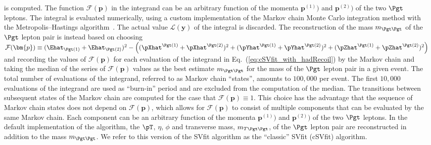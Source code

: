 is computed.
The function $\mathcal{F}(\bm{p})$ in the integrand can be an arbitrary function of the momenta $\bm{p}^{(1)})$ and $\bm{p}^{(2)})$ of the two $\Pgt$ leptons.
The integral is evaluated numerically, using a custom implementation of the Markov chain Monte Carlo integration method with the Metropolis–Hastings algorithm~\cite{Metropolis_Hastings}.
The actual value $\mathcal{L}(\bm{y})$ of the integral is discarded.
The reconstruction of the mass $m_{\Pgt\Pgt}$ of the $\Pgt$ lepton pair is instead based on choosing 
$\mathcal{F}(\bm{p}) \equiv (\Ehat_{\Pgt(1)} + \Ehat_{\Pgt(2)})^{2} 
 - \left( (\pXhat^{\Pgt(1)} + \pXhat^{\Pgt(2)})^{2} + (\pYhat^{\Pgt(1)} + \pYhat^{\Pgt(2)})^{2} + (\pZhat^{\Pgt(1)} + \pZhat^{\Pgt(2)})^{2} \right)$
and recording the values of $\mathcal{F}(\bm{p})$ for each evaluation of the integrand in Eq.~(\ref{eq:cSVfit_with_hadRecoil}) by the Markov chain
and taking the median of the series of $\mathcal{F}(\bm{p})$ values
as the best estimate $m_{\Pgt\Pgt}$ for the mass of the $\Pgt$ lepton pair in a given event.
The total number of evaluations of the integrand, referred to as Markov chain ``states'',  
amounts to $100,000$ per event. The first $10,000$ evaluations of the integrand are used as ``burn-in'' period and are excluded from the computation of the median.
The transitions between subsequent states of the Markov chain are computed for the case that $\mathcal{F}(\bm{p}) \equiv 1$.
This choice has the advantage that the sequence of Markov chain states does not depend on $\mathcal{F}(\bm{p})$,
which allows for $\mathcal{F}(\bm{p})$ to consist of multiple components that can be evaluated by the same Markov chain.
Each component can be an arbitrary function of the momenta $\bm{p}^{(1)})$ and $\bm{p}^{(2)})$ of the two $\Pgt$ leptons.
In the default implementation of the algorithm,
the $\pT$, $\eta$, $\phi$ and transverse mass, $m_{T\Pgt\Pgt}$, of the $\Pgt$ lepton pair
are reconstructed in addition to the mass $m_{\Pgt\Pgt}$.
We refer to this version of the SVfit algorithm as the ``classic'' SVfit (cSVfit) algorithm.

